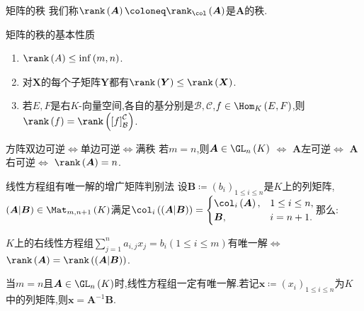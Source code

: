 \begin{definition}{矩阵的秩}{}
	我们称$\rank\left(\boldsymbol{A}\right)\coloneq\rank_{\col}\left(\boldsymbol{A}\right)$是$\boldsymbol{A}$的秩.
\end{definition}

\begin{proposition}{矩阵的秩的基本性质}{}
	\begin{enumerate}
		\item $\rank\left(A\right)\leq\inf\left(m,n\right)$.
		\item 对$\boldsymbol{X}$的每个子矩阵$\boldsymbol{Y}$都有$\rank\left(\boldsymbol{Y}\right)\leq\rank\left(\boldsymbol{X}\right)$.
		\item 若$E,F$是右$K$-向量空间,各自的基分别是$\mathcal{B},\mathcal{C}$,$f\in\Hom_{K}\left(E,F\right)$,则$\rank\left(f\right)=\rank\left(\left[f\right]_{\mathcal{B}}^{\mathcal{C}}\right)$.
	\end{enumerate}
\end{proposition}

\begin{proposition}{方阵双边可逆$\iff$单边可逆$\iff$满秩}{}
	若$m=n$,则$\boldsymbol{A}\in\GL_{n}\left(K\right)$ $\iff$ $\boldsymbol{A}$左可逆$\iff$ $\boldsymbol{A}$右可逆$\iff$ $\rank\left(\boldsymbol{A}\right)=n$.
\end{proposition}

\begin{proposition}{线性方程组有唯一解的增广矩阵判别法}{}
	设$\boldsymbol{B}\coloneq\left(b_{i}\right)_{1\leq i\leq n}$是$K$上的列矩阵,$\left(\boldsymbol{A}|\boldsymbol{B}\right)\in\Mat_{m,n+1}\left(K\right)$满足$\col_{i}\left(\left(\boldsymbol{A}|\boldsymbol{B}\right)\right)=
	\begin{cases}
		\col_{i}\left(\boldsymbol{A}\right),&1\leq i\leq n,\\
		\boldsymbol{B},&i=n+1.
	\end{cases}$那么:
	\begin{center}
		$K$上的右线性方程组$\sum\limits_{j=1}^{n}a_{i,j}x_{j}=b_{i}\left(1\leqslant i\leqslant m\right)$有唯一解$\iff$ $\rank\left(\boldsymbol{A}\right)=\rank\left(\left(\boldsymbol{A}|\boldsymbol{B}\right)\right)$.
	\end{center}
\end{proposition}

\begin{remark}{}{}
	当$m=n$且$\boldsymbol{A}\in\GL_{n}\left(K\right)$时,线性方程组一定有唯一解.若记$\boldsymbol{x}\coloneq\left(x_{i}\right)_{1\leq i\leq n}$为$K$中的列矩阵,则$\boldsymbol{x}=\boldsymbol{A}^{-1}\boldsymbol{B}$.
\end{remark}

